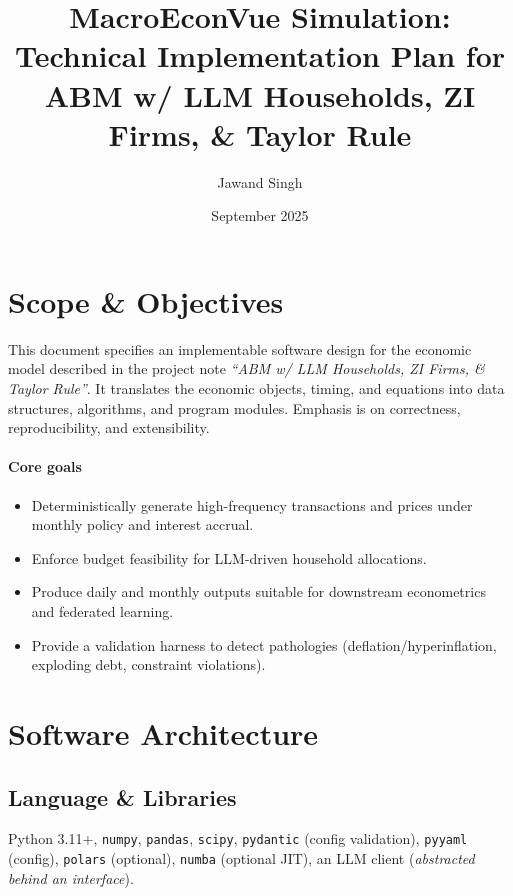 \documentclass[12pt]{article}
\title{MacroEconVue Simulation:\\
Technical Implementation Plan for\\
ABM w/ LLM Households, ZI Firms, \& Taylor Rule}
\author{Jawand Singh}
\date{September 2025}
\begin{document}
\maketitle

\section{Scope \& Objectives}
This document specifies an implementable software design for the economic model described in the project note
\emph{``ABM w/ LLM Households, ZI Firms, \& Taylor Rule''}. It translates the economic objects, timing, and equations into
data structures, algorithms, and program modules. Emphasis is on correctness, reproducibility, and extensibility.

\paragraph{Core goals}
\begin{itemize}
  \item Deterministically generate high-frequency transactions and prices under monthly policy and interest accrual.
  \item Enforce budget feasibility for LLM-driven household allocations.
  \item Produce daily and monthly outputs suitable for downstream econometrics and federated learning.
  \item Provide a validation harness to detect pathologies (deflation/hyperinflation, exploding debt, constraint violations).
\end{itemize}

\section{Software Architecture}
\subsection*{Language \& Libraries}
Python 3.11+, \texttt{numpy}, \texttt{pandas}, \texttt{scipy}, \texttt{pydantic} (config validation), \texttt{pyyaml} (config), \texttt{polars} (optional), \texttt{numba} (optional JIT), an LLM client (\emph{abstracted behind an interface}).
\end{document}
